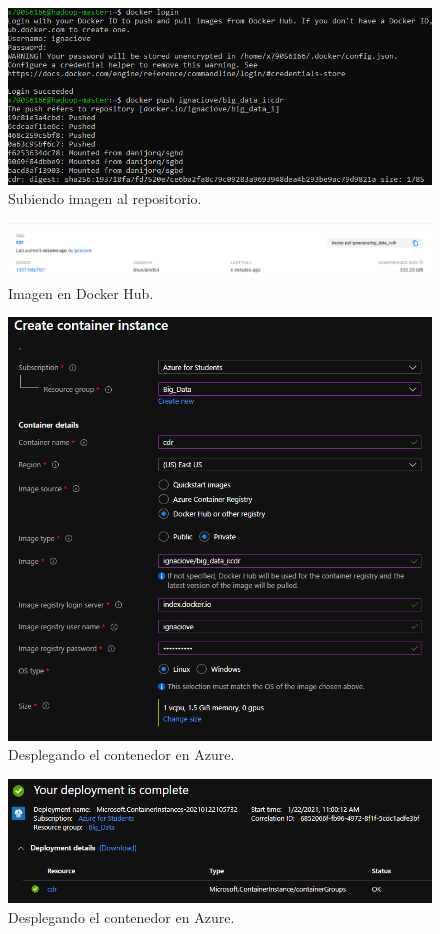 \begin{figure}[H]\center\includegraphics[width=.95\linewidth]{img/r/r5.png}\caption{Subiendo imagen al repositorio.}\end{figure}
\begin{figure}[H]\center\includegraphics[width=.95\linewidth]{img/r/r6.png}\caption{Imagen en Docker Hub.}\end{figure}
\begin{figure}[H]\center\includegraphics[width=.95\linewidth]{img/r/r7.png}\caption{Desplegando el contenedor en Azure.}\end{figure}

\begin{figure}[H]\center\includegraphics[width=.95\linewidth]{img/r/r8.png}\caption{Desplegando el contenedor en Azure.}\end{figure}

